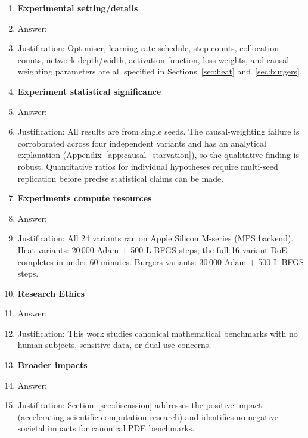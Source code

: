 \documentclass{article}
\begin{document}
\begin{enumerate}
\item \textbf{Experimental setting/details}
  \item[] Answer: \answerYes{}
  \item[] Justification: Optimiser, learning-rate schedule, step counts, collocation
    counts, network depth/width, activation function, loss weights, and causal
    weighting parameters are all specified in Sections~\ref{sec:heat}
    and~\ref{sec:burgers}.

\item \textbf{Experiment statistical significance}
  \item[] Answer: \answerNo{}
  \item[] Justification: All results are from single seeds.
    The causal-weighting failure is corroborated across four independent variants
    and has an analytical explanation (Appendix~\ref{app:causal_starvation}), so the
    qualitative finding is robust.
    Quantitative ratios for individual hypotheses require multi-seed replication
    before precise statistical claims can be made.

\item \textbf{Experiments compute resources}
  \item[] Answer: \answerYes{}
  \item[] Justification: All 24 variants ran on Apple Silicon M-series (MPS backend).
    Heat variants: 20\,000 Adam + 500 L-BFGS steps; the full 16-variant DoE completes
    in under 60 minutes.
    Burgers variants: 30\,000 Adam + 500 L-BFGS steps.

\item \textbf{Research Ethics}
  \item[] Answer: \answerYes{}
  \item[] Justification: This work studies canonical mathematical benchmarks with
    no human subjects, sensitive data, or dual-use concerns.

\item \textbf{Broader impacts}
  \item[] Answer: \answerYes{}
  \item[] Justification: Section~\ref{sec:discussion} addresses the positive
    impact (accelerating scientific computation research) and identifies no
    negative societal impacts for canonical PDE benchmarks.

\end{enumerate}
\end{document}

